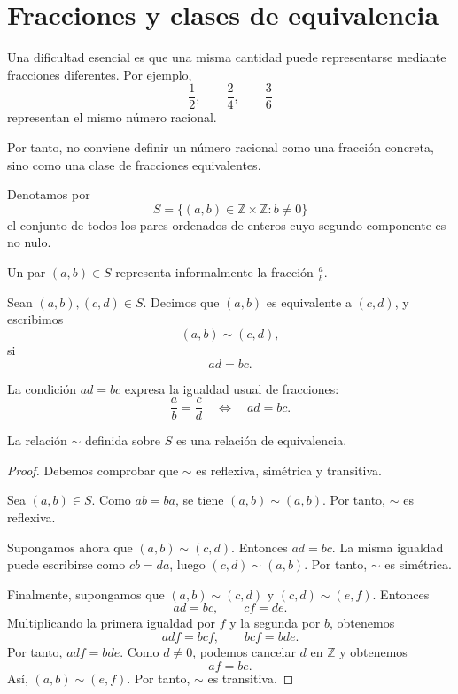 \section{Fracciones y clases de equivalencia}

Una dificultad esencial es que una misma cantidad puede representarse mediante fracciones diferentes. Por ejemplo,
\[
  \frac{1}{2},\qquad \frac{2}{4},\qquad \frac{3}{6}
\]
representan el mismo número racional.

Por tanto, no conviene definir un número racional como una fracción concreta, sino como una clase de fracciones equivalentes.

\begin{definicion}
Denotamos por
\[
  S=\{(a,b)\in \mathbb{Z}\times \mathbb{Z}: b\neq 0\}
\]
el conjunto de todos los pares ordenados de enteros cuyo segundo componente es no nulo.
\end{definicion}

Un par \((a,b)\in S\) representa informalmente la fracción \(\frac{a}{b}\).

\begin{definicion}
Sean \((a,b),(c,d)\in S\). Decimos que \((a,b)\) es equivalente a \((c,d)\), y escribimos
\[
  (a,b)\sim(c,d),
\]
si
\[
  ad=bc.
\]
\end{definicion}

La condición \(ad=bc\) expresa la igualdad usual de fracciones:
\[
  \frac{a}{b}=\frac{c}{d}
  \quad \Longleftrightarrow \quad
  ad=bc.
\]

\begin{proposicion}
La relación \(\sim\) definida sobre \(S\) es una relación de equivalencia.
\end{proposicion}

\begin{proof}
Debemos comprobar que \(\sim\) es reflexiva, simétrica y transitiva.

Sea \((a,b)\in S\). Como \(ab=ba\), se tiene \((a,b)\sim(a,b)\). Por tanto, \(\sim\) es reflexiva.

Supongamos ahora que \((a,b)\sim(c,d)\). Entonces \(ad=bc\). La misma igualdad puede escribirse como \(cb=da\), luego \((c,d)\sim(a,b)\). Por tanto, \(\sim\) es simétrica.

Finalmente, supongamos que \((a,b)\sim(c,d)\) y \((c,d)\sim(e,f)\). Entonces
\[
  ad=bc,
  \qquad
  cf=de.
\]
Multiplicando la primera igualdad por \(f\) y la segunda por \(b\), obtenemos
\[
  adf=bcf,
  \qquad
  bcf=bde.
\]
Por tanto, \(adf=bde\). Como \(d\neq 0\), podemos cancelar \(d\) en \(\mathbb{Z}\) y obtenemos
\[
  af=be.
\]
Así, \((a,b)\sim(e,f)\). Por tanto, \(\sim\) es transitiva.
\end{proof}

